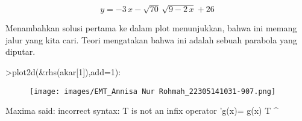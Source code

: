 \documentclass[a4paper,10pt]{article}
\begin{document}
\begin{eulernotebook}
\begin{eulercomment}
\begin{eulercomment}
\begin{eulercomment}
\begin{eulercomment}
\begin{eulercomment}
\end{eulercomment}
\begin{eulerformula}
\[
y=-3\,x-\sqrt{70}\,\sqrt{9-2\,x}+26
\]
\end{eulerformula}
\begin{eulercomment}
Menambahkan solusi pertama ke dalam plot menunjukkan, bahwa ini memang
jalur yang kita cari. Teori mengatakan bahwa ini adalah sebuah
parabola yang diputar.
\end{eulercomment}
\begin{eulerprompt}
>plot2d(&rhs(akar[1]),add=1):
\end{eulerprompt}
\begin{figure}[h]
    \centering
    \texttt{[image: images/EMT\_Annisa Nur Rohmah\_22305141031-907.png]}
\end{figure}
\begin{euleroutput}
  Maxima said:
  incorrect syntax: T is not an infix operator
  'g(x)= g(x)  T 
               ^
  

\end{euleroutput}
\end{eulercomment}
\end{eulercomment}
\end{eulercomment}
\end{eulercomment}
\end{eulernotebook}
\end{document}
